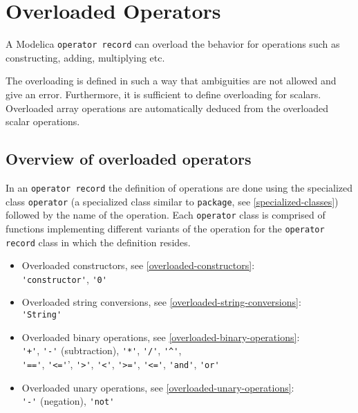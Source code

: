 \chapter{Overloaded Operators}\label{overloaded-operators}

A Modelica \lstinline!operator record! can overload the behavior for operations such as constructing, adding, multiplying etc.

The overloading is defined in such a way that ambiguities are not allowed and give an error.
Furthermore, it is sufficient to define overloading for scalars.
Overloaded array operations are automatically deduced from the overloaded scalar operations.

\section{Overview of overloaded operators}\label{overview-of-overloaded-operators}

In an \lstinline!operator record! the definition of operations are done using the specialized class \lstinline!operator! (a specialized class similar to \lstinline!package!, see \cref{specialized-classes}) followed by the name of the operation.
Each \lstinline!operator! class is comprised of functions implementing different variants of the operation for the \lstinline!operator record! class in which the definition resides.
%
\begin{itemize}
\item Overloaded constructors, see \cref{overloaded-constructors}:\\ \lstinline!'constructor'!, \lstinline!'0'!
\item Overloaded string conversions, see \cref{overloaded-string-conversions}:\\ \lstinline!'String'!
\item Overloaded binary operations, see \cref{overloaded-binary-operations}:\\
\lstinline!'+'!, \lstinline!'-'! (subtraction), \lstinline!'*'!, \lstinline!'/'!, \lstinline!'^'!,\\
 \lstinline!'=='!, \lstinline!'<='!', \lstinline!'>'!, \lstinline!'<'!,
\lstinline!'>='!, \lstinline!'<='!, \lstinline!'and'!, \lstinline!'or'!
\item Overloaded unary operations, see \cref{overloaded-unary-operations}:\\
\lstinline!'-'! (negation), \lstinline!'not'!
\end{itemize}

